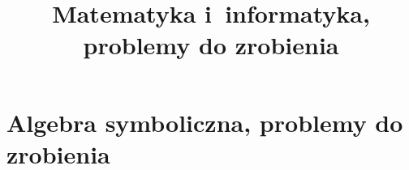 \documentclass[a4paper,11pt]{article}
\title{Matematyka i~informatyka, problemy do zrobienia}
\begin{document}





\maketitle  %





\section{Algebra symboliczna, problemy do zrobienia}


\end{document}
